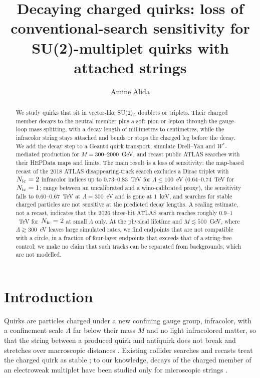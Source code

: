 \documentclass[prd,twocolumn,nofootinbib,superscriptaddress,amsmath,amssymb]{revtex4-2}
\begin{document}
\title{Decaying charged quirks: loss of conventional-search sensitivity for SU(2)-multiplet quirks with attached strings}

\author{Amine Alida}

\begin{abstract}
We study quirks that sit in vector-like SU(2)$_L$ doublets or triplets. Their charged member decays to the neutral member plus a soft pion or lepton through the gauge-loop mass splitting, with a decay length of millimetres to centimetres, while the infracolor string stays attached and bends or stops the charged leg before the decay. We add the decay step to a Geant4 quirk transport, simulate Drell--Yan and $W^*$-mediated production for $M=300$--$2000$~GeV, and recast public ATLAS searches with their HEPData maps and limits. The main result is a loss of sensitivity: the map-based recast of the 2018 ATLAS disappearing-track search excludes a Dirac triplet with $N_{\rm ic}=2$ infracolor indices up to $0.73$--$0.83$~TeV for $\Lambda\le100$~eV ($0.64$--$0.74$~TeV for $N_{\rm ic}=1$; range between an uncalibrated and a wino-calibrated proxy), the sensitivity falls to $0.60$--$0.67$~TeV at $\Lambda=300$~eV and is gone at $1$~keV, and searches for stable charged particles are not sensitive at the predicted decay lengths. A scaling estimate, not a recast, indicates that the 2026 three-hit ATLAS search reaches roughly $0.9$--$1$~TeV for $N_{\rm ic}=2$ at small $\Lambda$ only. At the physical lifetime and $M\lesssim500$~GeV, where $\Lambda\gtrsim300$~eV leaves large simulated rates, we find endpoints that are not compatible with a circle, in a fraction of four-layer endpoints that exceeds that of a string-free control; we make no claim that such tracks can be separated from backgrounds, which are not modelled.
\end{abstract}

\maketitle

\section{Introduction}
Quirks are particles charged under a new confining gauge group, infracolor, with a confinement scale $\Lambda$ far below their mass $M$ and no light infracolored matter, so that the string between a produced quirk and antiquirk does not break and stretches over macroscopic distances \cite{Okun:1980,KangLuty:2008}. Existing collider searches and recasts treat the charged quirk as stable \cite{FarinaLow:2017,Knapen:2017,Vami:2026,FASER:2026}; to our knowledge, decays of the charged member of an electroweak multiplet have been studied only for microscopic strings \cite{Harnik:2011,ForsythLowTenney:2025}.
\end{document}
